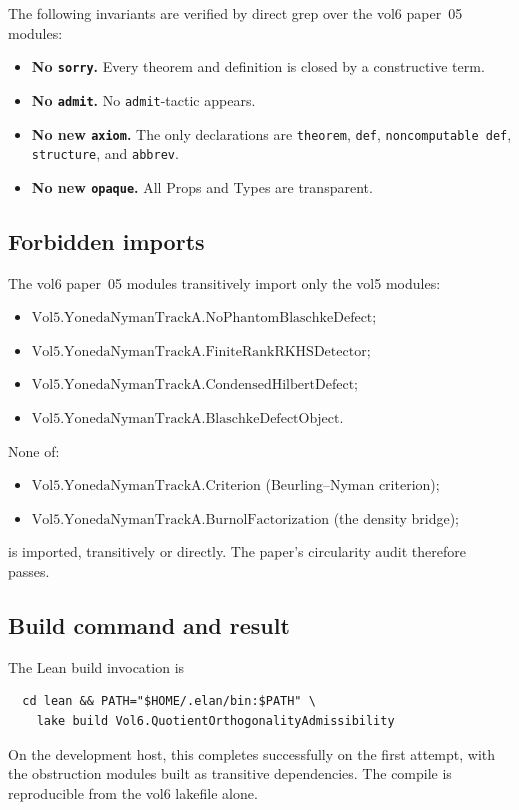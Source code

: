 \documentclass[12pt]{article}
\theoremstyle{definition}
\theoremstyle{remark}
\begin{document}
The following invariants are verified by direct grep over the vol6 paper~05 modules:

\begin{itemize}[leftmargin=2em]
  \item \textbf{No \texttt{sorry}.} Every theorem and definition is closed by a constructive term.
  \item \textbf{No \texttt{admit}.} No \texttt{admit}-tactic appears.
  \item \textbf{No new \texttt{axiom}.} The only declarations are \texttt{theorem}, \texttt{def}, \texttt{noncomputable def}, \texttt{structure}, and \texttt{abbrev}.
  \item \textbf{No new \texttt{opaque}.} All Props and Types are transparent.
\end{itemize}

\subsection{Forbidden imports}

The vol6 paper~05 modules transitively import only the vol5 modules:
\begin{itemize}
  \item $\mathrm{Vol5.YonedaNymanTrackA.NoPhantomBlaschkeDefect}$;
  \item $\mathrm{Vol5.YonedaNymanTrackA.FiniteRankRKHSDetector}$;
  \item $\mathrm{Vol5.YonedaNymanTrackA.CondensedHilbertDefect}$;
  \item $\mathrm{Vol5.YonedaNymanTrackA.BlaschkeDefectObject}$.
\end{itemize}
None of:
\begin{itemize}
  \item $\mathrm{Vol5.YonedaNymanTrackA.Criterion}$ (Beurling--Nyman criterion);
  \item $\mathrm{Vol5.YonedaNymanTrackA.BurnolFactorization}$ (the density bridge);
\end{itemize}
is imported, transitively or directly. The paper's circularity audit therefore passes.

\subsection{Build command and result}

The Lean build invocation is
\begin{verbatim}
  cd lean && PATH="$HOME/.elan/bin:$PATH" \
    lake build Vol6.QuotientOrthogonalityAdmissibility
\end{verbatim}
On the development host, this completes successfully on the first attempt, with the obstruction modules built as transitive dependencies. The compile is reproducible from the vol6 lakefile alone.
\end{document}
